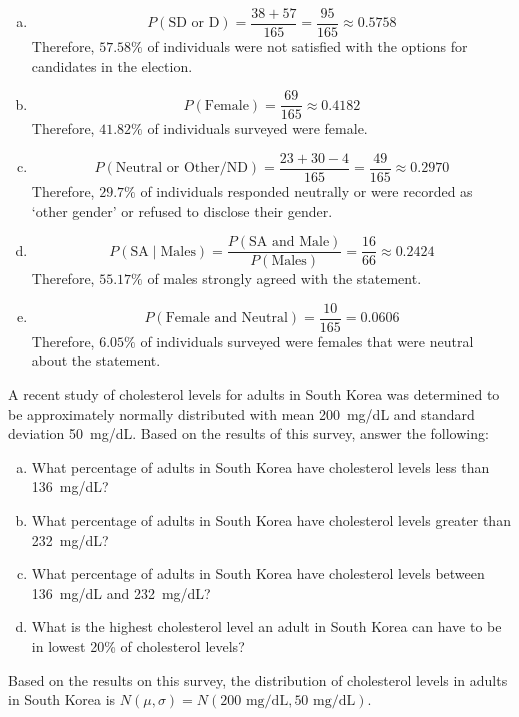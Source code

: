 \documentclass[12pt,letterpaper]{exam}
\begin{document}
\begin{questions}
{\footnotesize
\sol 
\begin{enumerate}[(a)]
\item 
	\[
	P(\text{SD or D})= \dfrac{38 + 57}{165}= \dfrac{95}{165} \approx 0.5758
	\]
Therefore, $57.58\%$ of individuals were not satisfied with the options for candidates in the election. 

\item 
	\[
	P(\text{Female})= \dfrac{69}{165} \approx 0.4182
	\] 
Therefore, $41.82\%$ of individuals surveyed were female. 

\item 
	\[
	P(\text{Neutral or Other/ND})= \dfrac{23 + 30 - 4}{165}= \dfrac{49}{165} \approx 0.2970
	\]
Therefore, $29.7\%$ of individuals responded neutrally or were recorded as `other gender' or refused to disclose their gender. 

\item 
	\[
	P(\text{SA} \;|\; \text{Males})= \dfrac{P(\text{SA and Male})}{P(\text{Males})}= \dfrac{16}{66} \approx 0.2424
	\]
Therefore, $55.17\%$ of males strongly agreed with the statement. 

\item 
	\[
	P(\text{Female and Neutral})= \dfrac{10}{165}= 0.0606
	\]
Therefore, $6.05\%$ of individuals surveyed were females that were neutral about the statement. 
\end{enumerate}
}



\newpage
\question[15] A recent study of cholesterol levels for adults in South Korea was determined to be approximately normally distributed with mean 200~mg/dL and standard deviation 50~mg/dL. Based on the results of this survey, answer the following:
        \begin{enumerate}[(a)]
        \item What percentage of adults in South Korea have cholesterol levels less than 136~mg/dL?
        \item What percentage of adults in South Korea have cholesterol levels greater than 232~mg/dL?
        \item What percentage of adults in South Korea have cholesterol levels between 136~mg/dL and 232~mg/dL?
        \item What is the highest cholesterol level an adult in South Korea can have to be in lowest 20\% of cholesterol levels?
        \end{enumerate} 

\sol Based on the results on this survey, the distribution of cholesterol levels in adults in South Korea is $N(\mu, \sigma)= N(200 \text{ mg/dL}, 50 \text{ mg/dL})$. 


\end{questions}
\end{document}
